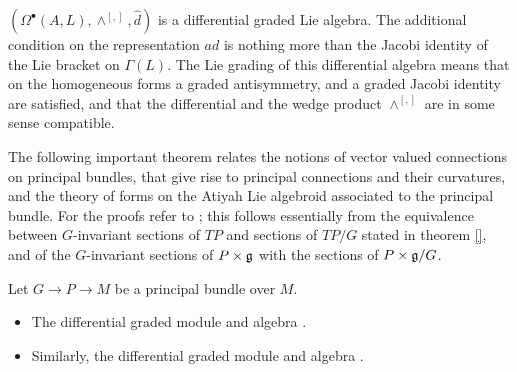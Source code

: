 \begin{example}
$(\Omega^\bullet(A, L), \wedge^{[,]}, \hat d)$ is a differential graded Lie algebra. The additional condition on the representation $ad$ is nothing more than the Jacobi identity of the Lie bracket on $\Gamma(L)$. The Lie grading of this differential algebra means that on the homogeneous forms a graded antisymmetry, and a graded Jacobi identity are satisfied, and that the differential and the wedge product $\wedge^{[,]}$ are in some sense compatible.
\end{example}

\linea

The following important theorem relates the notions of vector valued connections on principal bundles, that give rise to principal connections and their curvatures, and the theory of forms on the Atiyah Lie algebroid associated to the principal bundle. For the proofs refer to \cite{}; this follows essentially from the equivalence between $G$-invariant sections of $TP$ and sections of $TP/G$ stated in theorem \ref{}, and of the $G$-invariant sections of $P \times \mathfrak{g}$ with the sections of $P \times \mathfrak{g}/G$.

\begin{theorem}\label{theoFormsPrincipalAtiyahSameGInvariantEquivariantSubspaces}
Let $G \to P \to M$ be a principal bundle over $M$. 
\begin{itemize}
    \item The differential graded module and algebra .
    
    \item Similarly, the differential graded module and algebra .
\end{itemize} 
\end{theorem}

\linea



